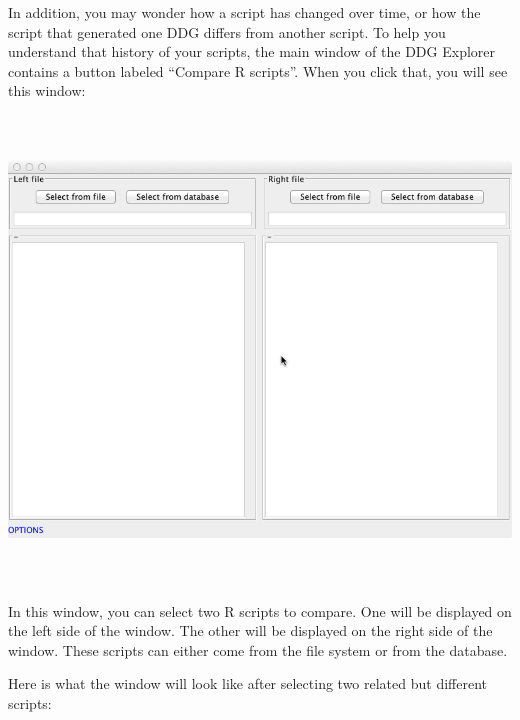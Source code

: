 \documentclass[12pt]{article}
\begin{document}
{{\mdseries\upshape\color{black}
In addition, you may wonder how a script has changed over time, or how the script that generated one DDG differs from another script. To help you understand that history of your scripts, the main window of the DDG Explorer contains a button labeled “Compare R scripts”. When you click that, you will see this window:}

 \includegraphics[width=6.5in,height=4.8752in]{UsingDDGExplorer-img/UsingDDGExplorer-img010.png} 

{\mdseries\upshape\color{black}
In this window, you can select two R scripts to compare. One will be displayed on the left side of the window. The other will be displayed on the right side of the window. These scripts can either come from the file system or from the database. }

{\mdseries\upshape\color{black}
Here is what the window will look like after selecting two related but different scripts:}

}
\end{document}
